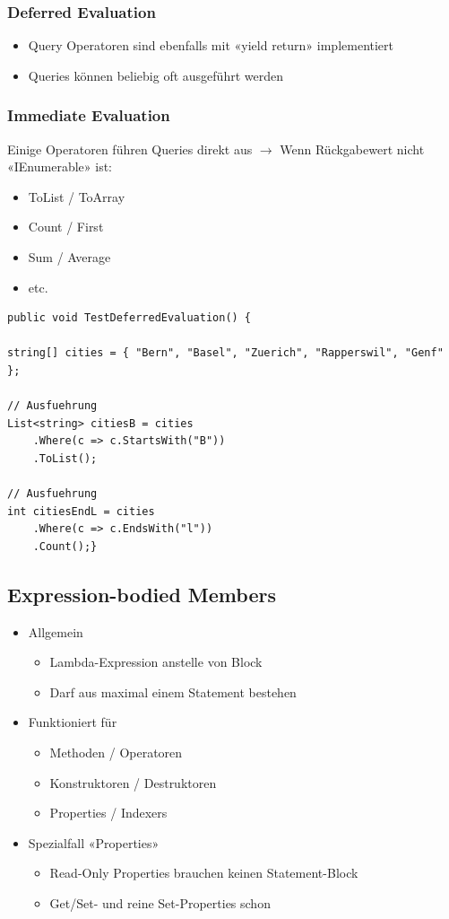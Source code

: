 \subsubsection{Deferred Evaluation}
\begin{itemize}
    \item Query Operatoren sind ebenfalls mit «yield return» implementiert
    \item Queries können beliebig oft ausgeführt werden
\end{itemize}

\subsubsection{Immediate Evaluation}
Einige Operatoren führen Queries direkt aus $\rightarrow$ Wenn Rückgabewert nicht «IEnumerable» ist:
\begin{itemize}
    \item ToList / ToArray
    \item Count / First
    \item Sum / Average
    \item etc.

\end{itemize}
\begin{lstlisting}
public void TestDeferredEvaluation() {

string[] cities = { "Bern", "Basel", "Zuerich", "Rapperswil", "Genf" };

// Ausfuehrung
List<string> citiesB = cities
    .Where(c => c.StartsWith("B"))
    .ToList();

// Ausfuehrung
int citiesEndL = cities
    .Where(c => c.EndsWith("l"))
    .Count();}
\end{lstlisting}


\subsection{Expression-bodied Members}
\begin{itemize}
    \item Allgemein
    \begin{itemize}
        \item Lambda-Expression anstelle von Block { }
        \item Darf aus maximal einem Statement bestehen
    \end{itemize}
    \item Funktioniert für
    \begin{itemize}
        \item Methoden / Operatoren
        \item Konstruktoren / Destruktoren
        \item Properties / Indexers
    \end{itemize}
    \item Spezialfall «Properties»
    \begin{itemize}
        \item Read-Only Properties brauchen keinen Statement-Block { }
        \item Get/Set- und reine Set-Properties schon
    \end{itemize}
\end{itemize}


